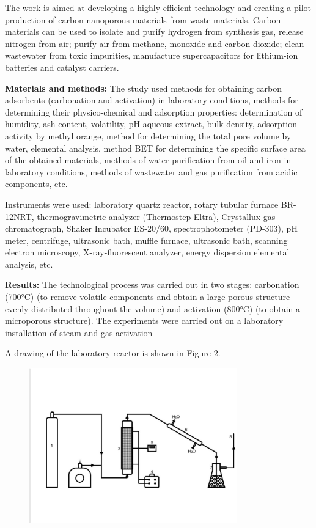 The work is aimed at developing a highly efficient technology and
creating a pilot production of carbon nanoporous materials from waste
materials. Carbon materials can be used to isolate and purify hydrogen
from synthesis gas, release nitrogen from air; purify air from methane,
monoxide and carbon dioxide; clean wastewater from toxic impurities,
manufacture supercapacitors for lithium-ion batteries and catalyst
carriers.

\textbf{Materials and methods:} The study used methods for obtaining
carbon adsorbents (carbonation and activation) in laboratory conditions,
methods for determining their physico-chemical and adsorption
properties: determination of humidity, ash content, volatility,
pH-aqueous extract, bulk density, adsorption activity by methyl orange,
method for determining the total pore volume by water, elemental
analysis, method BET for determining the specific surface area of the
obtained materials, methods of water purification from oil and iron in
laboratory conditions, methods of wastewater and gas purification from
acidic components, etc.

Instruments were used: laboratory quartz reactor, rotary tubular furnace
BR-12NRT, thermogravimetric analyzer (Thermostep Eltra), Crystallux gas
chromatograph, Shaker Incubator ES-20/60, spectrophotometer (PD-303), pH
meter, centrifuge, ultrasonic bath, muffle furnace, ultrasonic bath,
scanning electron microscopy, X-ray-fluorescent analyzer, energy
dispersion elemental analysis, etc.

\textbf{Results:} The technological process was carried out in two
stages: carbonation (700°C) (to remove volatile components and obtain a
large-porous structure evenly distributed throughout the volume) and
activation (800°C) (to obtain a microporous structure). The experiments
were carried out on a laboratory installation of steam and gas
activation

A drawing of the laboratory reactor is shown in Figure 2.

\begin{figure}[H]
	\centering
	\includegraphics[width=0.8\textwidth]{assets/1005}
	\caption*{}
\end{figure}

